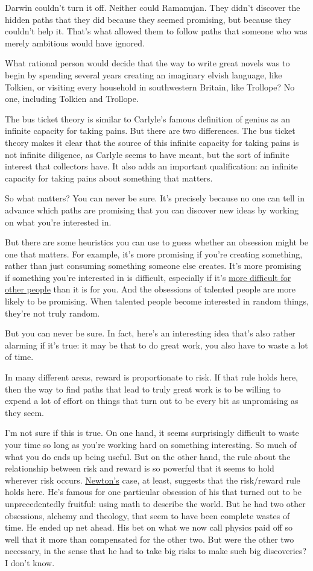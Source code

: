 \documentclass[12pt]{book}
\begin{document}
Darwin couldn't turn it off. Neither could Ramanujan. They didn't
discover the hidden paths that they did because they seemed promising,
but because they couldn't help it. That's what allowed them to follow
paths that someone who was merely ambitious would have ignored.

What rational person would decide that the way to write great novels was
to begin by spending several years creating an imaginary elvish
language, like Tolkien, or visiting every household in southwestern
Britain, like Trollope? No one, including Tolkien and Trollope.

The bus ticket theory is similar to Carlyle's famous definition of
genius as an infinite capacity for taking pains. But there are two
differences. The bus ticket theory makes it clear that the source of
this infinite capacity for taking pains is not infinite diligence, as
Carlyle seems to have meant, but the sort of infinite interest that
collectors have. It also adds an important qualification: an infinite
capacity for taking pains about something that matters.

So what matters? You can never be sure. It's precisely because no one
can tell in advance which paths are promising that you can discover new
ideas by working on what you're interested in.

But there are some heuristics you can use to guess whether an obsession
might be one that matters. For example, it's more promising if you're
creating something, rather than just consuming something someone else
creates. It's more promising if something you're interested in is
difficult, especially if it's \href{work.html}{more difficult for other
people} than it is for you. And the obsessions of talented people are
more likely to be promising. When talented people become interested in
random things, they're not truly random.

But you can never be sure. In fact, here's an interesting idea that's
also rather alarming if it's true: it may be that to do great work, you
also have to waste a lot of time.

In many different areas, reward is proportionate to risk. If that rule
holds here, then the way to find paths that lead to truly great work is
to be willing to expend a lot of effort on things that turn out to be
every bit as unpromising as they seem.

I'm not sure if this is true. On one hand, it seems surprisingly
difficult to waste your time so long as you're working hard on something
interesting. So much of what you do ends up being useful. But on the
other hand, the rule about the relationship between risk and reward is
so powerful that it seems to hold wherever risk occurs.
\href{disc.html}{Newton's} case, at least, suggests that the risk/reward
rule holds here. He's famous for one particular obsession of his that
turned out to be unprecedentedly fruitful: using math to describe the
world. But he had two other obsessions, alchemy and theology, that seem
to have been complete wastes of time. He ended up net ahead. His bet on
what we now call physics paid off so well that it more than compensated
for the other two. But were the other two necessary, in the sense that
he had to take big risks to make such big discoveries? I don't know.
\end{document}
